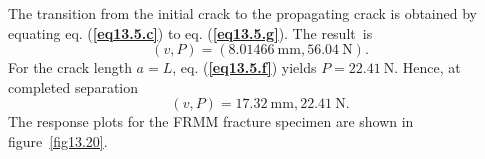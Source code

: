 \documentclass{AeroStructure-ERJohnson}
\begin{document}
\begin{example}
\noindent The transition from the initial crack to the propagating crack is obtained by equating eq. (\textbf{\ref{eq13.5.c}}) to eq. (\textbf{\ref{eq13.5.g}}). The result~is
\begin{equation}
(v, P)=(8.01466 \mathrm{~mm}, 56.04 \mathrm{~N}). \label{eq13.5.h}\tag{h}
\end{equation}
For the crack length $a=L$, eq. (\textbf{\ref{eq13.5.f}}) yields $P=22.41 \mathrm{~N}$. Hence, at completed separation
\begin{equation}
(v, P)=17.32 \mathrm{~mm}, 22.41 \mathrm{~N}. \label{eq13.5.i}\tag{i}
\end{equation}
The response plots for the FRMM fracture specimen are shown in figure~\ref{fig13.20}.
\end{example}

\end{document}
